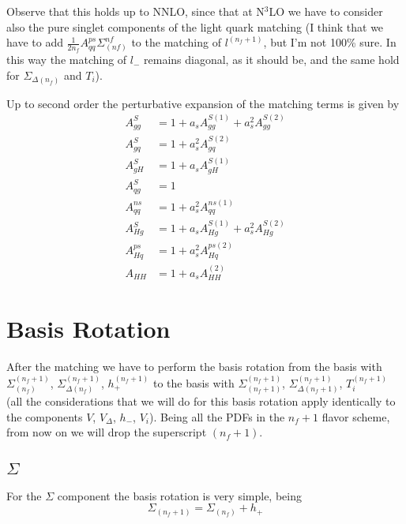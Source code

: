 \documentclass[a4paper,oneside]{article}
\begin{document}
Observe that this holds up to NNLO, since that at N$^3$LO we have to consider also the pure singlet components of the light quark matching (I think that we have to add $\frac{1}{2n_f}A^{ps}_{qq}\Sigma^{nf}_{(nf)}$ to the matching of $l^{(n_f+1)}$, but I'm not 100\% sure. In this way the matching of $l_-$ remains diagonal, as it should be, and the same hold for $\Sigma_{\Delta(n_f)}$ and $T_i$).

Up to second order the perturbative expansion of the matching terms is given by
\begin{align*}
A^S_{gg} & = 1+ a_s A^{S(1)}_{gg} + a_s^2 A^{S(2)}_{gg} \\
A^S_{gq} & = 1+ a_s^2 A^{S(2)}_{gq} \\
A^S_{gH} & = 1+ a_s A^{S(1)}_{gH} \\
A^S_{qg} & = 1 \\
A^{ns}_{qq} &= 1+ a_s^2 A^{ns(1)}_{qq}  \\
A^S_{Hg} & = 1+ a_s A^{S(1)}_{Hg} + a_s^2 A^{S(2)}_{Hg} \\
A^{ps}_{Hq} & = 1+ a_s^2 A^{ps(2)}_{Hq} \\
A_{HH} & = 1+ a_s A^{(2)}_{HH}
\end{align*}

\section{Basis Rotation}

After the matching we have to perform the basis rotation from the basis with $\Sigma_{(n_f)}^{(n_f+1)}$, $\Sigma_{\Delta(n_f)}^{(n_f+1)}$, $h_+^{(n_f+1)}$ to the basis with $\Sigma_{(n_f+1)}^{(n_f+1)}$, $\Sigma_{\Delta(n_f+1)}^{(n_f+1)}$, $T_i^{(n_f+1)}$ (all the considerations that we will do for this basis rotation apply identically to the components $V$, $V_\Delta$, $h_-$, $V_i$). Being all the PDFs in the $n_f+1$ flavor scheme, from now on we will drop the superscript $(n_f+1)$.

\subsection{$\Sigma$}
For the $\Sigma$ component the basis rotation is very simple, being
\begin{equation*}
\Sigma_{(n_f+1)}=\Sigma_{(n_f)}+h_+
\end{equation*}
\end{document}
